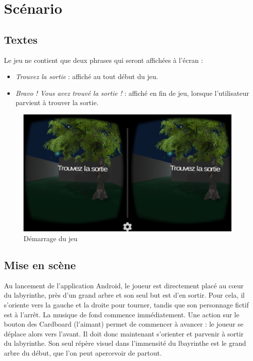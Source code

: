 \chapter{Scénario}\label{scenario}

\section{Textes}

Le jeu ne contient que deux phrases qui seront affichées à l'écran :
\begin{itemize}
  \item \textit{Trouvez la sortie} : affiché au tout début du jeu.
  \item \textit{Bravo ! Vous avez trouvé la sortie !} : affiché en fin de jeu, lorsque l'utilisateur parvient à trouver la sortie.
\end{itemize}

\begin{figure}[h!]
  \centering
  \includegraphics[width=1.0\textwidth]{res/img/trouvez-la-sortie.png}
  \caption{Démarrage du jeu}
\end{figure}

\section{Mise en scène}
Au lancement de l'application Android, le joueur est directement placé au c\oe{}ur du labyrinthe, près d'un grand arbre et son seul but est d'en sortir. Pour cela, il s'oriente vers la gauche et la droite pour tourner, tandis que son personnage fictif est à l'arrêt. La musique de fond commence immédiatement. Une action sur le bouton des Cardboard (l'aimant) permet de commencer à avancer : le joueur se déplace alors vers l'avant. Il doit donc maintenant s'orienter et parvenir à sortir du labyrinthe. Son seul répère visuel dans l'immensité du lbayrinthe est le grand arbre du début, que l'on peut apercevoir de partout.

